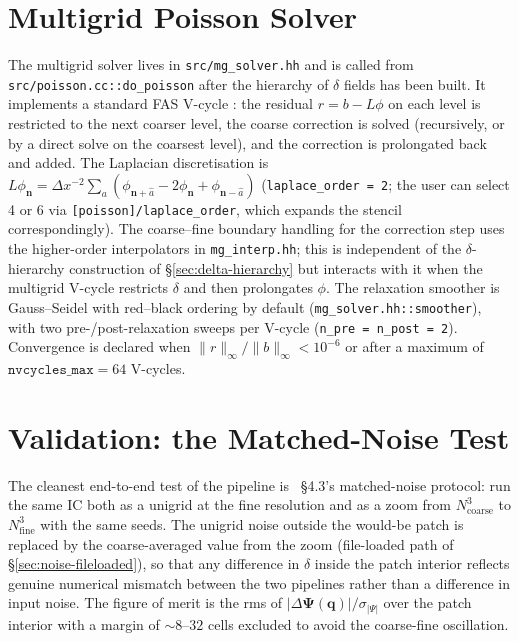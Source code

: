 \documentclass[12pt]{article}
\newcommand{\bq}{\mathbf{q}}
\newcommand{\bn}{\mathbf{n}}
\newcommand{\code}[1]{\texttt{#1}}
\begin{document}
\section{Multigrid Poisson Solver}
\label{sec:multigrid}

The multigrid solver lives in \code{src/mg\_solver.hh} and is called
from \code{src/poisson.cc::do\_poisson} after the hierarchy of
$\delta$ fields has been built.  It implements a standard FAS
V-cycle \citep{Brandt1977, Trottenberg2001}: the residual
$r = b - L\phi$ on each level is restricted to the next coarser
level, the coarse correction is solved (recursively, or by a direct
solve on the coarsest level), and the correction is prolongated
back and added.  The Laplacian discretisation is
$L\phi_\bn = \Delta x^{-2} \sum_{a} (\phi_{\bn+\hat a} - 2\phi_\bn + \phi_{\bn-\hat a})$
(\code{laplace\_order = 2}; the user can select 4 or 6 via
\code{[poisson]/laplace\_order}, which expands the stencil
correspondingly).  The coarse--fine boundary handling for the
correction step uses the higher-order interpolators in
\code{mg\_interp.hh}; this is independent of the $\delta$-hierarchy
construction of \S\ref{sec:delta-hierarchy} but interacts with it
when the multigrid V-cycle restricts $\delta$ and then prolongates
$\phi$.  The relaxation smoother is Gauss--Seidel with red--black
ordering by default (\code{mg\_solver.hh::smoother}), with two
pre-/post-relaxation sweeps per V-cycle (\code{n\_pre = n\_post = 2}).
Convergence is declared when $\|r\|_\infty / \|b\|_\infty < 10^{-6}$
or after a maximum of $\code{nvcycles\_max} = 64$ V-cycles.

\section{Validation: the Matched-Noise Test}
\label{sec:validation}

The cleanest end-to-end test of the pipeline is
\citet{Hahn2011}~\S4.3's matched-noise protocol: run the same IC
both as a unigrid at the fine resolution and as a zoom from
$N_\mathrm{coarse}^3$ to $N_\mathrm{fine}^3$ with the same seeds.
The unigrid noise outside the would-be patch is replaced by the
coarse-averaged value from the zoom (file-loaded path of
\S\ref{sec:noise-fileloaded}), so that any difference in $\delta$
inside the patch interior reflects genuine numerical mismatch
between the two pipelines rather than a difference in input noise.
The figure of merit is the rms of
$|\Delta\boldsymbol\Psi(\bq)| / \sigma_{|\Psi|}$ over the patch
interior with a margin of $\sim 8$--$32$ cells excluded to avoid
the coarse-fine oscillation.
\end{document}
